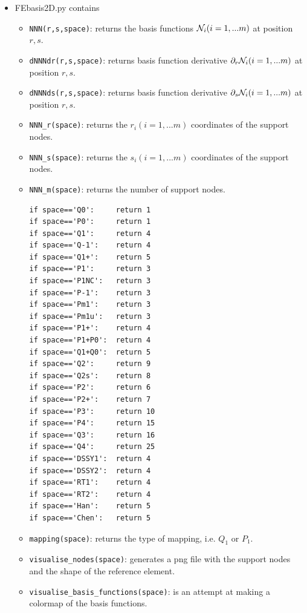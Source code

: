 \begin{itemize}

\item {\pythonfile FEbasis2D.py} contains 

\begin{itemize}
\item \lstinline{NNN(r,s,space)}: returns the basis functions ${\mathcal{N}}_i (i=1,...m)$ at position $r,s$.
\item \lstinline{dNNNdr(r,s,space)}: returns basis function derivative $\partial_r{\mathcal{N}}_i (i=1,...m)$ at position $r,s$.
\item \lstinline{dNNNds(r,s,space)}: returns basis function derivative $\partial_s{\mathcal{N}}_i (i=1,...m)$ at position $r,s$.
\item \lstinline{NNN_r(space)}: returns the $r_i (i=1,...m)$ coordinates of the support nodes.
\item \lstinline{NNN_s(space)}: returns the $s_i (i=1,...m)$ coordinates of the support nodes.

\item \lstinline{NNN_m(space)}: returns the number of support nodes.
\begin{lstlisting}
if space=='Q0':     return 1
if space=='P0':     return 1
if space=='Q1':     return 4
if space=='Q-1':    return 4
if space=='Q1+':    return 5
if space=='P1':     return 3
if space=='P1NC':   return 3
if space=='P-1':    return 3
if space=='Pm1':    return 3
if space=='Pm1u':   return 3
if space=='P1+':    return 4
if space=='P1+P0':  return 4
if space=='Q1+Q0':  return 5
if space=='Q2':     return 9
if space=='Q2s':    return 8
if space=='P2':     return 6
if space=='P2+':    return 7
if space=='P3':     return 10
if space=='P4':     return 15
if space=='Q3':     return 16
if space=='Q4':     return 25
if space=='DSSY1':  return 4
if space=='DSSY2':  return 4
if space=='RT1':    return 4
if space=='RT2':    return 4
if space=='Han':    return 5
if space=='Chen':   return 5
\end{lstlisting}


\item \lstinline{mapping(space)}: returns the type of mapping, i.e. $Q_1$ or $P_1$.
\item \lstinline{visualise_nodes(space)}: generates a png file with the support nodes and the shape of the reference element.
\item \lstinline{visualise_basis_functions(space)}: is an attempt at making a colormap of the basis functions.
\end{itemize}



\end{itemize}
